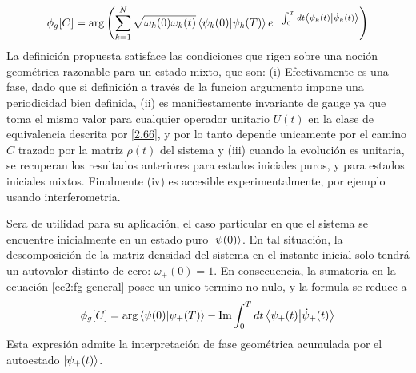 \begin{equation}\label{ec2:fg general}
    \phi_g[C]=\arg \left( \sum_{k=1}^{N} \sqrt{\omega_k(0)\omega_k(t)} \braket{\psi_k(0)}{\psi_k(T)}e^{-\int_{0}^{T}dt\braket{\psi_k(t)}{\dot\psi_k(t)}} \right)
\end{equation}
La definición propuesta satisface las condiciones que rigen sobre una noción geométrica razonable para un estado mixto, que son: (i) Efectivamente es una fase, dado que si definición a través de la funcion argumento impone una periodicidad bien definida, (ii) es manifiestamente invariante de gauge ya que toma el mismo valor para cualquier operador unitario $U(t)$ en la clase de equivalencia descrita por \ref{2.66}, y por lo tanto depende unicamente por el camino $C$ trazado por la matriz $\rho(t)$ del sistema y (iii) cuando la evolución es unitaria, se recuperan los resultados anteriores para estados iniciales puros, y \cite{9-10} para estados iniciales mixtos. Finalmente (iv) es accesible experimentalmente, por ejemplo usando interferometria.

Sera de utilidad para su aplicación, el caso particular en que el sistema se encuentre inicialmente en un estado puro $\ket{\psi(0)}$. En tal situación, la descomposición de la matriz densidad del sistema en el instante inicial solo tendrá un autovalor distinto de cero: $\omega_+(0)=1$. En consecuencia, la sumatoria en la ecuación \ref{ec2:fg general} posee un unico termino no nulo, y la formula se reduce a 
\begin{equation}\label{ec2:fg general puro}
    \phi_g[C]=\arg{\braket{\psi(0)}{\psi_+(T)}}-\Im \int_{0}^{T}dt \braket{\psi_+(t)}{\dot\psi_+(t)}
\end{equation}
Esta expresión admite la interpretación de fase geométrica acumulada por el autoestado $\ket{\psi_+(t)}$.

